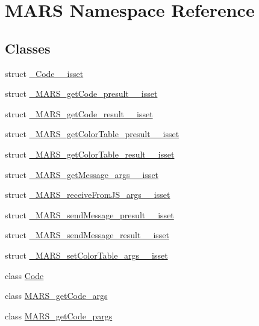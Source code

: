 \hypertarget{namespaceMARS}{}\section{M\+A\+RS Namespace Reference}
\label{namespaceMARS}
\subsection*{Classes}
\begin{DoxyCompactItemize}
\item 
struct \hyperlink{structMARS_1_1__Code____isset}{\+\_\+\+Code\+\_\+\+\_\+isset}
\item 
struct \hyperlink{structMARS_1_1__MARS__getCode__presult____isset}{\+\_\+\+M\+A\+R\+S\+\_\+get\+Code\+\_\+presult\+\_\+\+\_\+isset}
\item 
struct \hyperlink{structMARS_1_1__MARS__getCode__result____isset}{\+\_\+\+M\+A\+R\+S\+\_\+get\+Code\+\_\+result\+\_\+\+\_\+isset}
\item 
struct \hyperlink{structMARS_1_1__MARS__getColorTable__presult____isset}{\+\_\+\+M\+A\+R\+S\+\_\+get\+Color\+Table\+\_\+presult\+\_\+\+\_\+isset}
\item 
struct \hyperlink{structMARS_1_1__MARS__getColorTable__result____isset}{\+\_\+\+M\+A\+R\+S\+\_\+get\+Color\+Table\+\_\+result\+\_\+\+\_\+isset}
\item 
struct \hyperlink{structMARS_1_1__MARS__getMessage__args____isset}{\+\_\+\+M\+A\+R\+S\+\_\+get\+Message\+\_\+args\+\_\+\+\_\+isset}
\item 
struct \hyperlink{structMARS_1_1__MARS__receiveFromJS__args____isset}{\+\_\+\+M\+A\+R\+S\+\_\+receive\+From\+J\+S\+\_\+args\+\_\+\+\_\+isset}
\item 
struct \hyperlink{structMARS_1_1__MARS__sendMessage__presult____isset}{\+\_\+\+M\+A\+R\+S\+\_\+send\+Message\+\_\+presult\+\_\+\+\_\+isset}
\item 
struct \hyperlink{structMARS_1_1__MARS__sendMessage__result____isset}{\+\_\+\+M\+A\+R\+S\+\_\+send\+Message\+\_\+result\+\_\+\+\_\+isset}
\item 
struct \hyperlink{structMARS_1_1__MARS__setColorTable__args____isset}{\+\_\+\+M\+A\+R\+S\+\_\+set\+Color\+Table\+\_\+args\+\_\+\+\_\+isset}
\item 
class \hyperlink{classMARS_1_1Code}{Code}
\item 
class \hyperlink{classMARS_1_1MARS__getCode__args}{M\+A\+R\+S\+\_\+get\+Code\+\_\+args}
\item 
class \hyperlink{classMARS_1_1MARS__getCode__pargs}{M\+A\+R\+S\+\_\+get\+Code\+\_\+pargs}

\end{DoxyCompactItemize}
